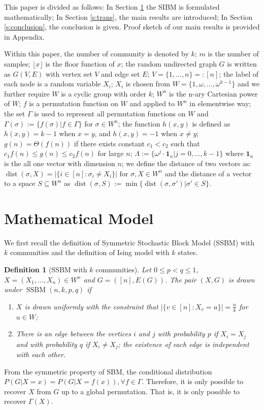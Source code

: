 \label{key}\documentclass[conference]{IEEEtran}
\newtheorem{definition}{Definition}%
\DeclareMathOperator{\SSBM}{SSBM}
\DeclareMathOperator{\dist}{dist}
\begin{document}
This paper is divided as follows: In Section \ref{s:Preliminaries} the SIBM is formulated mathematically;
In Section \ref{s:trans}, the main results are introduced;
In Section \ref{s:conclusion}, the conclusion is given. Proof sketch of our main results is provided in Appendix.

Within this paper, the number of community is denoted by $k$; $m$ is the number of samples; $\lfloor x \rfloor$ is the floor function of $x$; the random undirected graph $G$ is written as $G(V,E)$ with vertex set $V$ and edge set $E$;
$V=\{1,\dots, n\} =: [n]$;
the label of each node is a random variable $X_i$; $X_i$ is chosen from $W= \{1, \omega, \dots, \omega^{k-1}\}$ and we further require $W$
is a cyclic group with order $k$; $W^n$ is the n-ary Cartesian power of $W$; $f$ is a permutation function on $W$ and applied to $W^n$ in elementwise way; the set $\Gamma$ is used to represent all permutation functions on $W$ and $\Gamma(\sigma):=\{f(\sigma)| f\in \Gamma\}$ for $\sigma \in W^n$; the function $h(x, y)$ is defined as
$h(x, y) = k-1 $ when $x=y$, and $h(x, y)=-1$ when $x\neq y$; $g(n) = \Theta(f(n))$ if there exists constant $c_1 < c_2$ such that $c_1 f(n) \leq g(n) \leq c_2 f(n)$
for large $n$;
$\Lambda := \{ \omega^j  \cdot \mathbf{1}_n | j=0, \dots,k-1\}$
where $\mathbf{1}_n$ is the all one vector with dimension $n$;
we define the distance of two vectors as:
$\dist(\sigma, X)
=|\{i\in[n]:\sigma_i\neq X_i\}| \textrm{ for } \sigma,X\in W^n
$ and the distance of a vector to a space $S\subseteq W^n$
as
$\dist(\sigma,S)
:=\min\{\dist(\sigma, \sigma') | \sigma' \in S\}
$.

\section{Mathematical Model} \label{s:Preliminaries}
We first recall the definition of Symmetric Stochastic Block Model (SSBM) with $k$ communities \cite{Abbe17} and the definition of Ising model with $k$ states.
\begin{definition}[SSBM with $k$ communities] \label{def:SSBM}
Let $0\leq p<q\leq 1$, $X=(X_1,\dots,X_n)\in W^n$ and $G=([n],E(G))$. The pair $(X,G)$ is drawn under $\SSBM(n,k,p,q)$ if 
\begin{enumerate}
\item $X$ is drawn uniformly with the constraint that $|\{v \in [n] : X_v = u\}| = \frac{n}{k}$ for $u\in W$;

\item There is an edge between the vertices $i$ and $j$ with probability $p$ if $X_i=X_j$ and with probability $q$ if $X_i \neq X_j$; the existence of each edge is independent with each other.
\end{enumerate}
\end{definition}
From the symmetric property of SBM, the conditional distribution $P(G|X=x) = P(G|X=f(x)), \forall f \in \Gamma$. Therefore, it is only possible to recover $X$ from $G$ up to a global permutation. That is, it is only possible to recover $\Gamma(X)$.
\end{document}
